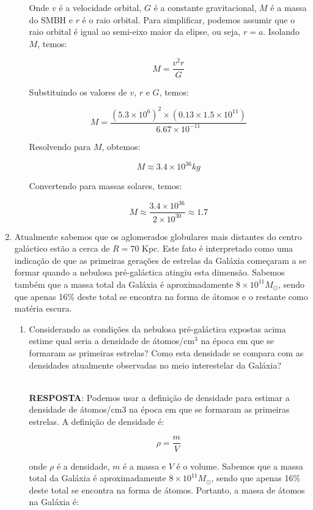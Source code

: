 \documentclass[a4paper,12pt]{article}
\begin{document}
\begin{enumerate}
\begin{enumerate}
Onde $v$ é a velocidade orbital, $G$ é a constante gravitacional, $M$ é a massa do SMBH e $r$ é o raio orbital. Para simplificar, podemos assumir que o raio orbital é igual ao semi-eixo maior da elipse, ou seja, $r = a$. Isolando $M$, temos:

$$M = \frac{v^2 r}{G}$$

Substituindo os valores de $v$, $r$ e $G$, temos:

$$M = \frac{(5.3 \times 10^6)^2 \times (0.13 \times 1.5 \times 10^{11})}{6.67 \times 10^{-11}}$$

Resolvendo para $M$, obtemos:

$$M \approx 3.4 \times 10^{36} kg$$

Convertendo para massas solares, temos:

$$M \approx \frac{3.4 \times 10^{36}}{2 \times 10^{30}} \approx 1.7
$$

\end{enumerate}

\noindent\hrulefill

\item Atualmente sabemos que os aglomerados globulares mais distantes do centro galáctico estão a cerca de $R=70$ Kpc. Este fato é interpretado como uma indicação de que as primeiras gerações de estrelas da Galáxia começaram a se formar quando a nebulosa pré-galáctica atingiu esta dimensão. Sabemos também que a massa total da Galáxia é aproximadamente $8\times 10^{11} M_{\odot}$, sendo que apenas 16\% deste total se encontra na forma de átomos e o restante como matéria escura.
\begin{enumerate}
\item Considerando as condições da nebulosa pré-galáctica expostas acima estime qual seria a densidade de átomos/cm$^3$ na época em que se formaram as primeiras estrelas? Como esta densidade se compara com as densidades atualmente observadas no meio interestelar da Galáxia?

\noindent\hrulefill\\\textbf{RESPOSTA}: Podemos usar a definição de densidade para estimar a densidade de átomos/cm3 na época em que se formaram as primeiras estrelas. A definição de densidade é:

$$\rho = \frac{m}{V}$$

onde $\rho$ é a densidade, $m$ é a massa e $V$ é o volume. Sabemos que a massa total da Galáxia é aproximadamente $8 \times 10^{11} M_{\odot}$, sendo que apenas 16\% deste total se encontra na forma de átomos. Portanto, a massa de átomos na Galáxia é:


\end{enumerate}
\end{enumerate}
\end{document}
